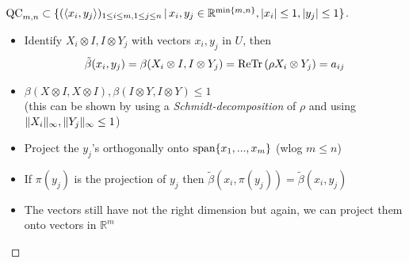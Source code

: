 \begin{frame}
	\begin{proof}[$ \textup{QC}_{m,n} \subset \{ (\langle x_i,y_j \rangle)_{1 \le i \le m, 1 \le j \le n} \,| \, x_i,y_j \in \mathbb{R}^{ \min \{m,n \} }, \vert x_i  \vert \le 1, \vert y_j \vert \le 1  \} $]
		\begin{itemize}
			\item<1-> {\footnotesize Identify $ X_i \otimes I,I \otimes Y_j $ with vectors $ x_i,y_j $ in $ U $, then 
			\begin{align*}
			\tilde{\beta}(x_i,y_j) = \beta(X_i \otimes I,I \otimes Y_j) = \textup{Re} \textup{Tr} \, {(\rho X_i \otimes Y_j)}  = a_{ij}
			\end{align*}}
			\item<1-> $ \beta (X \otimes I, X \otimes I), \beta (I \otimes Y, I \otimes Y) \le 1$ \\
			(this can be shown by using a {\itshape Schmidt-decomposition} of $ \rho $ and using $  \Vert {X_i} \Vert_{\infty},  \Vert {Y_j} \Vert_{\infty} \le 1 $)
			\item<2-> Project the $ y_j $'s orthogonally onto $ \textup{span} \{ x_1,...,x_m \} $  (wlog $ m \le n $)
			\item<3-> If $ \pi(y_j) $ is the projection of $ y_j $ then $ \tilde{\beta}(x_i,\pi(y_j)) = \tilde{\beta}(x_i,y_j) $
			\item<4-> The vectors still have not the right dimension but again, we can project them onto vectors in $ \mathbb{R}^m $
		\end{itemize}
		
	\end{proof}
\end{frame}


